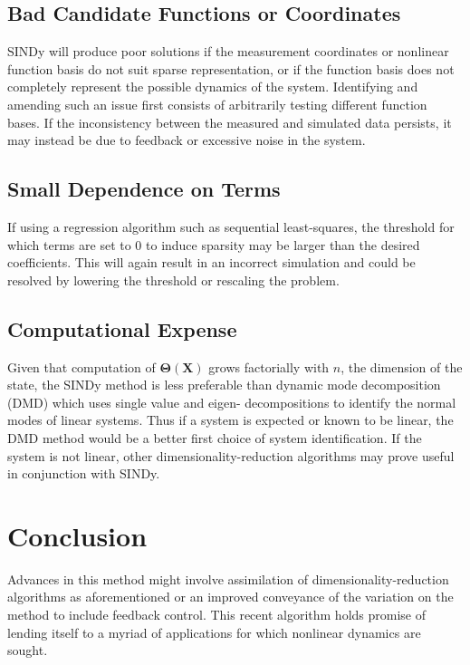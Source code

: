 \documentclass[%
 aip,12pt,
rsi,%
 amsmath,amssymb,
 reprint,%
]{revtex4-1}
\begin{document}
{\subsection{Bad Candidate Functions or Coordinates}
SINDy will produce poor solutions if the measurement coordinates or nonlinear function basis do not suit sparse representation, or if the function basis does not completely represent the possible dynamics of the system. Identifying and amending such an issue first consists of arbitrarily testing different function bases. If the inconsistency between the measured and simulated data persists, it may instead be due to feedback or excessive noise in the system.

\subsection{Small Dependence on Terms}
If using a regression algorithm such as sequential least-squares, the threshold for which terms are set to 0 to induce sparsity may be larger than the desired coefficients. This will again result in an incorrect simulation and could be resolved by lowering the threshold or rescaling the problem.

\subsection{Computational Expense}
Given that computation of $\bm{\Theta}(\bm{X})$ grows factorially with $n$, the dimension of the state, the SINDy method is less preferable than dynamic mode decomposition (DMD) which uses single value and eigen- decompositions to identify the normal modes of linear systems. Thus if a system is expected or known to be linear, the DMD method would be a better first choice of system identification. If the system is not linear, other dimensionality-reduction algorithms may prove useful in conjunction with SINDy.




\section{Conclusion}

Advances in this method might involve assimilation of dimensionality-reduction algorithms as aforementioned or an improved conveyance of the variation on the method to include feedback control. This recent algorithm holds promise of lending itself to a myriad of applications for which nonlinear dynamics are sought.


}


\nocite{*}
\end{document}
